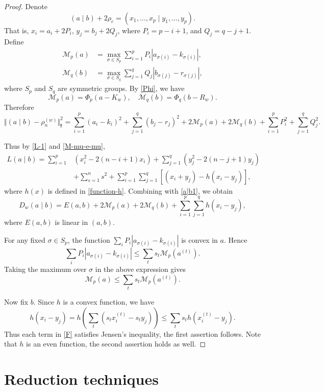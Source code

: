 \documentclass[11pt]{amsart}
\theoremstyle{plain}
\theoremstyle{definition}
\newcommand{\frk}{\mathfrak{k}}
\newcommand{\caM}{\mathcal{M}}
\begin{document}
 \begin{proof}
 	 Denote
 	\[(a\mid b)+2\rho_c=(x_1,\dots,x_p\mid y_1,\dots,y_p).\]
 	That is, $x_i=a_i+2P_i$, $y_j=b_j+2Q_j$,  where $P_i=p-i+1$, and $Q_j=q-j+1$.
  Define
 	\begin{align*}
 		\caM_p(a)&=\max_{\sigma\in S_p}\sum_{i=1}^p P_i|a_{\sigma(i)}-k_{\sigma(i)}|,\\
 		\caM_q(b)&=\max_{\sigma\in S_q}\sum_{j=1}^q Q_j|b_{\sigma(j)}-r_{\sigma(j)}|,
 	\end{align*}
 	where $S_p$ and $S_q$ are symmetric groups. By \eqref{Phi}, we have
 	\[\caM_p(a)=\Phi_p(a-K_w),\quad \caM_q(b)=\Phi_q(b-R_w).\]
 	Therefore
 	\begin{equation}\label{a|b1}
 		\Vert (a\mid b)-\rho_n^{(w)}\Vert_\frk^2=\sum_{i=1}^p(a_i-k_i)^2+\sum_{j=1}^q(b_j-r_j)^2+2\caM_p(a)+2\caM_q(b)+\sum_{i=1}^pP_i^2+\sum_{j=1}^qQ_j^2.
 	\end{equation}
 	

 	Thus by \eqref{L-1} and \eqref{M-mu-e-mu},
 	\begin{align*}
 		L(a\mid b)=\sum_{i=1}^p&(x_i^2-2(n-i+1)x_i)+\sum_{j=1}^q(y_j^2-2(n-j+1)y_j)\\
 		&+\sum_{s=1}^ns^2+\sum_{i=1}^p\sum_{j=1}^q[(x_i+y_j)-h(x_i-y_j)],
 	\end{align*}
where $h(x)$ is defined in \eqref{function-h}.
 	Combining with \eqref{a|b1}, we obtain
 	\begin{equation}\label{F}
 		D_{w}(a\mid b)=E(a,b)+2\caM_p(a)+2\caM_q(b)+\sum_{i=1}^p\sum_{j=1}^qh(x_i-y_j),
 	\end{equation}
 	where $E(a,b)$ is linear  in $(a,b)$.
 	
 	For any fixed $\sigma\in S_p$, the function $\sum_i P_i|a_{\sigma(i)}-k_{\sigma(i)}|$ is convex in $a$. Hence
 	\[\sum_i P_i|a_{\sigma(i)}-k_{\sigma(i)}|\le\sum_ts_t\caM_p(a^{(t)}).\]
 	Taking the maximum over $\sigma$ in the above expression gives
 	\[\caM_p(a)\le \sum_ts_t\caM_p(a^{(t)}).\]

 	


 	

Now fix $b$. Since $h$ is a convex function, we have
 	\[h(x_i-y_j) =  h\left(\sum_t (s_t x_i^{(t)}- s_t y_j) \right) \le \sum_ts_th(x_i^{(t)}-y_j).\]
Thus each term in \eqref{F} satisfies Jensen's inequality, the first assertion follows. Note that $h$ is an even function, the second assertion holds as well.
 \end{proof}


\section{Reduction techniques}\label{sec-RT}
\end{document}
